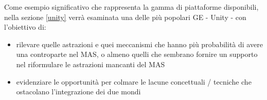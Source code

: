\medskip

Come esempio significativo che rappresenta la gamma di piattaforme disponibili, nella sezione \ref{unity} verrà esaminata una delle più popolari GE - Unity \cite{unity} - con l'obiettivo di:
\begin{itemize}
    \item rilevare quelle astrazioni e quei meccanismi che hanno più probabilità di avere una controparte nel MAS, o almeno quelli che sembrano fornire un supporto nel riformulare le astrazioni mancanti del MAS
    \item evidenziare le opportunità per colmare le lacune concettuali / tecniche che ostacolano l'integrazione dei due mondi
\end{itemize}
